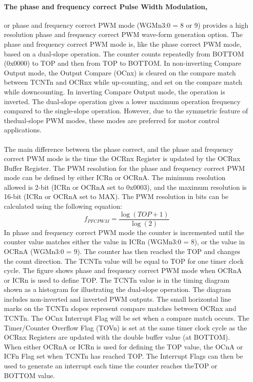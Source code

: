 \documentclass[english]{article}
\begin{document}
\paragraph{The phase and frequency correct Pulse Width Modulation,}or phase and frequency correct PWM mode (WGMn3:0 = 8 or 9) provides a high resolution phase and frequency correct PWM wave-form generation option. The phase and frequency correct PWM mode is, like the phase correct PWM mode, based on a dual-slope operation. The counter counts repeatedly from BOTTOM (0x0000) to TOP and then from TOP to BOTTOM. In non-inverting Compare Output mode, the Output Compare (OCnx) is cleared on the compare match between TCNTn and OCRnx while up-counting, and set on the compare match while downcounting. In inverting Compare Output mode, the operation is inverted. The dual-slope operation gives a lower maximum operation frequency compared to the single-slope operation. However, due to the symmetric feature of thedual-slope PWM modes, these modes are preferred for motor control applications.\\\\
The main difference between the phase correct, and the phase and frequency correct PWM mode is the time the OCRnx Register is updated by the OCRnx Buffer Register.
The PWM resolution for the phase and frequency correct PWM mode can be defined by either ICRn or OCRnA. The minimum resolution allowed is 2-bit (ICRn or OCRnA set to 0x0003), and the maximum resolution is 16-bit (ICRn or OCRnA set to MAX). The PWM resolution in bits can be calculated using the following equation: 
$$
f_{PFCPWM}=\frac{\log(TOP+1)}{\log(2)}
$$
In phase and frequency correct PWM mode the counter is incremented until the counter value
matches either the value in ICRn (WGMn3:0 = 8), or the value in OCRnA (WGMn3:0 = 9). The counter has then reached the TOP and changes the count direction. The TCNTn value will be equal to TOP for one timer clock cycle. The figure shows phase and frequency correct PWM mode when OCRnA or ICRn is used to define TOP. The TCNTn value is in the timing diagram shown as a histogram for illustrating the dual-slope operation. The diagram includes non-inverted and inverted PWM outputs. The small horizontal line marks on the TCNTn slopes represent compare matches between OCRnx and TCNTn. The OCnx Interrupt Flag will be set when a compare match occurs.
The Timer/Counter Overflow Flag (TOVn) is set at the same timer clock cycle as the OCRnx Registers are updated with the double buffer value (at BOTTOM). When either OCRnA or ICRn is used for defining the TOP value, the OCnA or ICFn Flag set when TCNTn has reached TOP. The Interrupt Flags can then be used to generate an interrupt each time the counter reaches theTOP or BOTTOM value.\\\\
\end{document}
